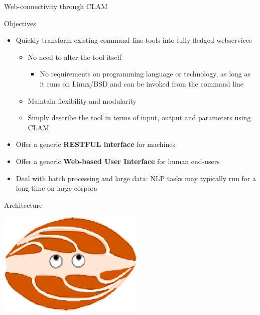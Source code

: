 \documentclass[xcolor=table,10pt,t]{beamer}
\begin{document}
\begin{frame}{Web-connectivity through CLAM}
  \begin{block}{Objectives}
      \begin{itemize}
        \item Quickly transform existing command-line tools into fully-fledged webservices
        \begin{itemize}
            \item No need to alter the tool itself
            \begin{itemize}
                \item \footnotesize{No requirements on programming language or technology, as
                long as it runs on Linux/BSD and can be invoked from the command line}
            \end{itemize}
            \item Maintain flexibility and modularity
            \item Simply describe the tool in terms of input, output and
                parameters using CLAM
        \end{itemize}
        \item Offer a generic \textbf{RESTFUL interface} for machines
        \item Offer a generic \textbf{Web-based User Interface} for human end-users
        \item Deal with batch processing and large data: NLP tasks may typically run for a
            long time on large corpora
      \end{itemize}
  \end{block}
\end{frame}


\begin{frame}{Architecture}

    \begin{center}
    \includegraphics[width=70.0mm]{clamup.png}
    \end{center}

\end{frame}
\end{document}
